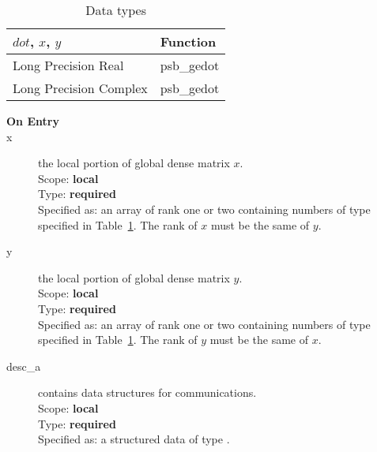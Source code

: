 \begin{table}[h]
\begin{center}
\begin{tabular}{ll}
\hline
$dot$, $x$, $y$ & {\bf Function}\\
\hline
Long Precision Real & psb\_gedot \\
Long Precision Complex & psb\_gedot \\	
\hline
\end{tabular}
\end{center}
\caption{Data types\label{tab:f90dot}}
\end{table}

\begin{description}
\item[\bf On Entry]
\item[x] the local portion of global dense matrix
$x$.\\
Scope: {\bf local} \\
Type: {\bf required} \\
Specified as: an array of rank one or two
containing numbers of type specified in
Table~\ref{tab:f90dot}. The rank of $x$ must be the same of $y$. 
\item[y] the local portion of global dense matrix
$y$. \\
Scope: {\bf local} \\
Type: {\bf required} \\
Specified as: an array of rank one or two
containing numbers of type specified in
Table~\ref{tab:f90dot}. The rank of $y$ must be the same of $x$. 
\item[desc\_a] contains data structures for communications.\\
Scope: {\bf local} \\
Type: {\bf required}\\
Specified as: a structured data of type \descdata.


\end{description}
